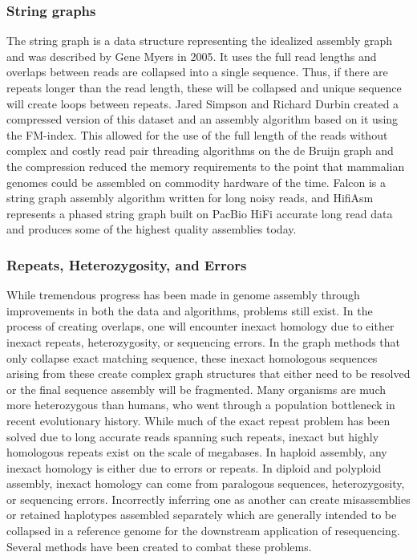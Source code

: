 \subsubsection{String graphs}

\par{
The string graph is a data structure representing the idealized assembly graph and was described by Gene Myers in 2005\cite{Myers2005}. It uses the full read lengths and overlaps between reads are collapsed into a single sequence. Thus, if there are repeats longer than the read length, these will be collapsed and unique sequence will create loops between repeats. Jared Simpson and Richard Durbin created a compressed version of this dataset and an assembly algorithm based on it using the FM-index\cite{fmindex2}\cite{fmindex}\cite{SGA}. This allowed for the use of the full length of the reads without complex and costly read pair threading algorithms on the de Bruijn graph and the compression reduced the memory requirements to the point that mammalian genomes could be assembled on commodity hardware of the time. Falcon\cite{falcon} is a string graph assembly algorithm written for long noisy reads, and HifiAsm represents a phased string graph built on PacBio HiFi accurate long read data\cite{hifiasm} and produces some of the highest quality assemblies today.
}


\subsubsection{Repeats, Heterozygosity, and Errors}

\par{
While tremendous progress has been made in genome assembly through improvements in both the data and algorithms, problems still exist. In the process of creating overlaps, one will encounter inexact homology due to either inexact repeats, heterozygosity, or sequencing errors. In the graph methods that only collapse exact matching sequence, these inexact homologous sequences arising from these create complex graph structures that either need to be resolved or the final sequence assembly will be fragmented\cite{assemblyissues}. Many organisms are much more heterozygous than humans, who went through a population bottleneck in recent evolutionary history\cite{bottleneck}. While much of the exact repeat problem has been solved due to long accurate reads spanning such repeats, inexact but highly homologous repeats exist on the scale of megabases\cite{segmentaldups}. In haploid assembly, any inexact homology is either due to errors or repeats. In diploid and polyploid assembly, inexact homology can come from paralogous sequences, heterozygosity, or sequencing errors. Incorrectly inferring one as another can create misassemblies or retained haplotypes assembled separately which are generally intended to be collapsed in a reference genome for the downstream application of resequencing. Several methods have been created to combat these problems.
}
